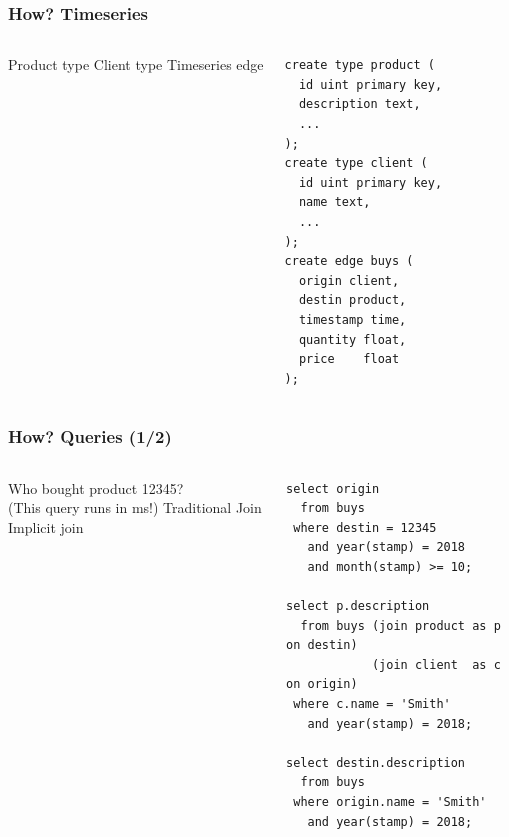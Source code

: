 \documentclass[mathserif]{beamer}
\begin{document}
\begin{frame}[fragile]
\frametitle{How? Timeseries}
\begin{columns}[T]
\vskip0.5cm
{\small Product type}
\vskip1.7cm
{\small Client type}
\vskip1.7cm
{\small Timeseries edge}
\begin{sqlcode}
\begin{lstlisting}
create type product (
  id uint primary key,
  description text,
  ...
);
create type client (
  id uint primary key,
  name text,
  ...
);
create edge buys (
  origin client,
  destin product,
  timestamp time,
  quantity float,
  price    float
);
\end{lstlisting}
\end{sqlcode}
\end{columns}
\end{frame}

\begin{frame}[fragile]
\frametitle{How? Queries (1/2)}
\begin{columns}[T]
\vskip0.5cm
{\small Who bought product 12345?}\\
{\tiny  (This query runs in ms!)}
\vskip1.0cm
{\small Traditional Join}
\vskip1.9cm
{\small Implicit join}
\begin{sqlcode}
\begin{lstlisting}
select origin
  from buys
 where destin = 12345
   and year(stamp) = 2018
   and month(stamp) >= 10;

select p.description
  from buys (join product as p on destin)
            (join client  as c on origin)
 where c.name = 'Smith'
   and year(stamp) = 2018;

select destin.description
  from buys
 where origin.name = 'Smith'
   and year(stamp) = 2018;
\end{lstlisting}
\end{sqlcode}
\end{columns}
\end{frame}
\end{document}
